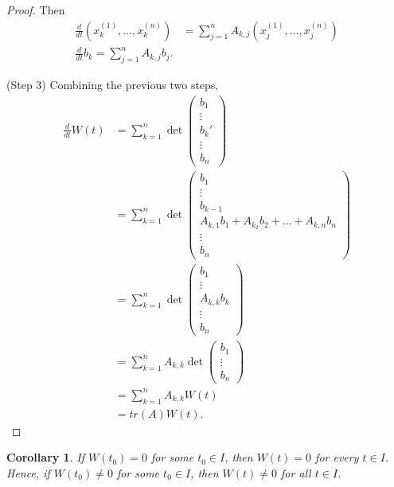 \documentclass{tufte-handout}
\newtheorem{cor}[thm]{Corollary}
\theoremstyle{definition}
\begin{document}
\begin{proof}
	Then 
	\begin{align*}
		\frac{d}{dt}(x_k^{(1)}, \ldots, x_k^{(n)}) &= \sum\limits_{j=1}^{n} A_{k,j} \left( x_j^{(1)},\ldots,x_j^{(n)} \right) \\
		\frac{d}{dt}b_k = \sum\limits_{j=1}^{n} A_{k,j}b_j
	.\end{align*}

	(Step 3) Combining the previous two steps, 
	\begin{align*}
		\frac{d}{dt}W(t) &= \sum\limits_{k=1}^{n} \det\begin{pmatrix}
		b_1  \\
		\vdots \\
		b_k' \\
		\vdots \\
		b_n
		\end{pmatrix} \\
						 &= \sum\limits_{k=1}^{n} \det\begin{pmatrix}
						 b_1 \\
						 \vdots \\
						 b_{k-1} \\
						 A_{k,1} b_1 + A_{k_2}b_2 + \ldots + A_{k,n}b_n \\
						 \vdots \\
						 b_n
						 \end{pmatrix}   \\
						 &= \sum\limits_{k=1}^{n} \det\begin{pmatrix}
						 b_1 \\
						 \vdots \\
						 A_{k,k}b_k \\
						 \vdots \\
						 b_n
						 \end{pmatrix}  \\
						 &= \sum\limits_{k=1}^{n} A_{k,k} \det \begin{pmatrix}
						 b_1 \\
						 \vdots \\
						 b_n
						 \end{pmatrix}  \\
						 &= \sum\limits_{k=1}^{n} A_{k,k} W(t) \\
						 &= tr(A) W(t)
	.\end{align*}

\end{proof}

\begin{cor}
	If $W(t_0) = 0$ for some $t_0 \in I$, then $W(t) = 0$ for every $t \in I$. Hence, if $W(t_0) \ne 0$ for some $t_0 \in I$, then $W(t) \ne 0$ for all $t \in I$.
\end{cor}
\end{document}
